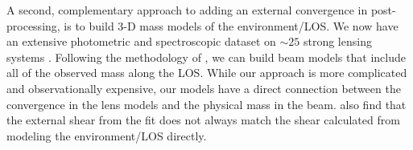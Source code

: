 A second, complementary approach to adding an external convergence in post-processing, is to build 3-D mass models of the environment/LOS.  We now have an extensive photometric and spectroscopic dataset on $\sim25$ strong lensing systems \citep{Momcheva06,Williams08, Wong11}. Following the methodology of \citet{Wong11}, we can build beam models that include all of the observed mass along the LOS.  While our approach is more complicated and observationally expensive, our models have a direct connection between the convergence in the lens models and the physical mass in the beam. \citet{Wong11} also find that the external shear from the fit does not always match the shear calculated from modeling the environment/LOS directly.
  